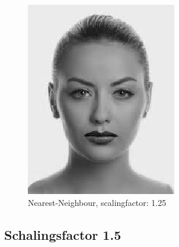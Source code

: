 \documentclass{article}
\begin{document}
    \begin{figure}[H]
      \centering
      \includegraphics[]{assets/Nearest_Female_125.png}
      \caption{Nearest-Neighbour, scalingfactor: 1.25}
      \label{fig:sub3}
    \end{figure}
    
\clearpage
\subsection{Schalingsfactor 1.5}
\end{document}
